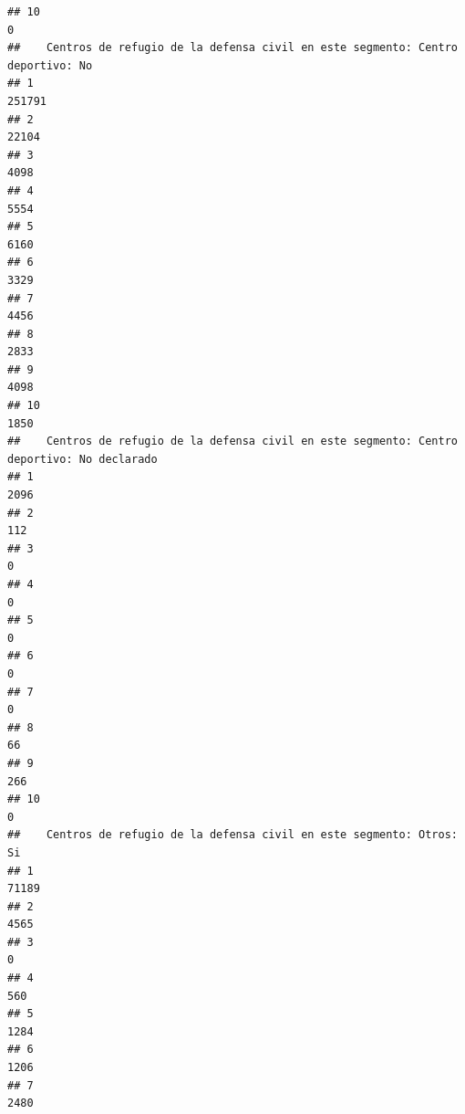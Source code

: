 \documentclass[11pt,]{article}
\begin{document}
\begin{verbatim}
## 10                                                                             0
##    Centros de refugio de la defensa civil en este segmento: Centro deportivo: No
## 1                                                                         251791
## 2                                                                          22104
## 3                                                                           4098
## 4                                                                           5554
## 5                                                                           6160
## 6                                                                           3329
## 7                                                                           4456
## 8                                                                           2833
## 9                                                                           4098
## 10                                                                          1850
##    Centros de refugio de la defensa civil en este segmento: Centro deportivo: No declarado
## 1                                                                                     2096
## 2                                                                                      112
## 3                                                                                        0
## 4                                                                                        0
## 5                                                                                        0
## 6                                                                                        0
## 7                                                                                        0
## 8                                                                                       66
## 9                                                                                      266
## 10                                                                                       0
##    Centros de refugio de la defensa civil en este segmento: Otros: Si
## 1                                                               71189
## 2                                                                4565
## 3                                                                   0
## 4                                                                 560
## 5                                                                1284
## 6                                                                1206
## 7                                                                2480

\end{verbatim}
\end{document}
